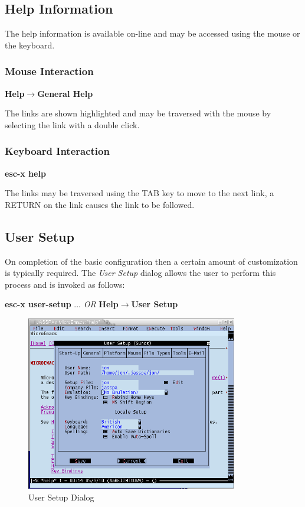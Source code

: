 \documentclass[11pt,a4paper,pdftex]{article}
\begin{document}
\subsection{Help Information}

    The help information is available on-line and may be accessed using the
    mouse or the keyboard.

\subsubsection{Mouse Interaction}

    \textbf{Help$\rightarrow$General Help}

    The links are shown highlighted and may be traversed with the mouse by
    selecting the link with a double click.

\subsubsection{Keyboard Interaction}

    \textbf{esc-x help}

    The links may be traversed using the TAB key to move to the next link, a
    RETURN on the link causes the link to be followed.

\subsection{User Setup}

    On completion of the basic configuration then a certain amount of
    customization is typically required. The \textit{User Setup} dialog
    allows the user to perform this process and is invoked as follows:

    \textbf{esc-x user-setup} $\dots$ \textit{OR}\newline
    \textbf{Help$\rightarrow$User Setup}

\begin{figure}[!hbt]
  \begin{center}
    \includegraphics[keepaspectratio,height=3in]{usersetup}
    \caption{User Setup Dialog}
    \label{fig:usersetup}
  \end{center}
\end{figure}
\end{document}
